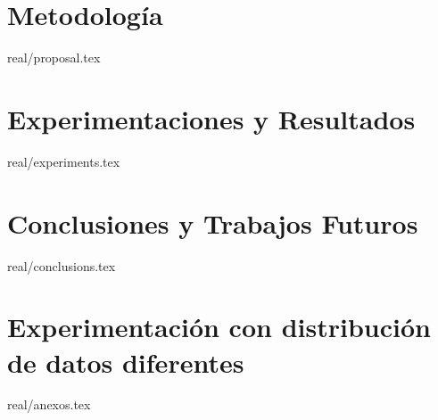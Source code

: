 \documentclass{report}
\begin{document}

\chapter{Metodología}
{real/proposal.tex}





\chapter{Experimentaciones y Resultados}
{real/experiments.tex}



\chapter{Conclusiones y Trabajos Futuros}

{real/conclusions.tex}









%

\nocite{zobel}
\nocite{swales}




\newpage
\appendix

\chapter{Experimentación con distribución de datos diferentes}
{real/anexos.tex}
\end{document}
